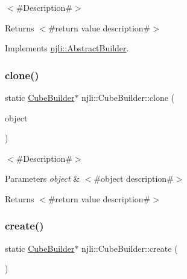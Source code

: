 $<$\#\+Description\#$>$

\begin{DoxyReturn}{Returns}
$<$\#return value description\#$>$ 
\end{DoxyReturn}


Implements \mbox{\hyperlink{classnjli_1_1_abstract_builder_aa1d220053e182c37b31b427499c6eacf}{njli\+::\+Abstract\+Builder}}.

\mbox{\label{classnjli_1_1_cube_builder_a8efc6aa59541a7f5f7ca61161e74c0a4}} 
\subsubsection{\texorpdfstring{clone()}{clone()}}
{\footnotesize\ttfamily static \mbox{\hyperlink{classnjli_1_1_cube_builder}{Cube\+Builder}}$\ast$ njli\+::\+Cube\+Builder\+::clone (\begin{DoxyParamCaption}\item[{const \mbox{\hyperlink{classnjli_1_1_cube_builder}{Cube\+Builder}} \&}]{object }\end{DoxyParamCaption})\hspace{0.3cm}{\ttfamily [static]}}

$<$\#\+Description\#$>$


\begin{DoxyParams}{Parameters}
{\em object} & $<$\#object description\#$>$\\
\hline
\end{DoxyParams}
\begin{DoxyReturn}{Returns}
$<$\#return value description\#$>$ 
\end{DoxyReturn}
\mbox{\label{classnjli_1_1_cube_builder_ad35c9d6eef7138613a33e726d91d6ea7}} 
\subsubsection{\texorpdfstring{create()}{create()}}
{\footnotesize\ttfamily static \mbox{\hyperlink{classnjli_1_1_cube_builder}{Cube\+Builder}}$\ast$ njli\+::\+Cube\+Builder\+::create (\begin{DoxyParamCaption}{ }\end{DoxyParamCaption})\hspace{0.3cm}{\ttfamily [static]}}

